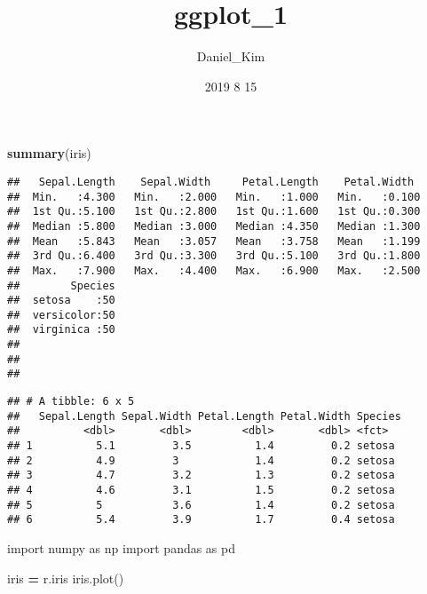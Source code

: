 \documentclass[]{article}
\title{ggplot\_1}
\author{Daniel\_Kim}
\date{2019 8 15}
\newenvironment{Shaded}{\begin{snugshade}}{\end{snugshade}}
\newcommand{\ImportTok}[1]{#1}
\newcommand{\KeywordTok}[1]{\textcolor[rgb]{0.13,0.29,0.53}{\textbf{#1}}}
\newcommand{\NormalTok}[1]{#1}
\newcommand{\OperatorTok}[1]{\textcolor[rgb]{0.81,0.36,0.00}{\textbf{#1}}}
\newcommand{\StringTok}[1]{\textcolor[rgb]{0.31,0.60,0.02}{#1}}
\begin{document}
\maketitle

\begin{Shaded}
\begin{Highlighting}[]
\KeywordTok{summary}\NormalTok{(iris)}
\end{Highlighting}
\end{Shaded}

\begin{verbatim}
##   Sepal.Length    Sepal.Width     Petal.Length    Petal.Width   
##  Min.   :4.300   Min.   :2.000   Min.   :1.000   Min.   :0.100  
##  1st Qu.:5.100   1st Qu.:2.800   1st Qu.:1.600   1st Qu.:0.300  
##  Median :5.800   Median :3.000   Median :4.350   Median :1.300  
##  Mean   :5.843   Mean   :3.057   Mean   :3.758   Mean   :1.199  
##  3rd Qu.:6.400   3rd Qu.:3.300   3rd Qu.:5.100   3rd Qu.:1.800  
##  Max.   :7.900   Max.   :4.400   Max.   :6.900   Max.   :2.500  
##        Species  
##  setosa    :50  
##  versicolor:50  
##  virginica :50  
##                 
##                 
## 
\end{verbatim}

\begin{Shaded}
\end{Shaded}

\begin{verbatim}
## # A tibble: 6 x 5
##   Sepal.Length Sepal.Width Petal.Length Petal.Width Species
##          <dbl>       <dbl>        <dbl>       <dbl> <fct>  
## 1          5.1         3.5          1.4         0.2 setosa 
## 2          4.9         3            1.4         0.2 setosa 
## 3          4.7         3.2          1.3         0.2 setosa 
## 4          4.6         3.1          1.5         0.2 setosa 
## 5          5           3.6          1.4         0.2 setosa 
## 6          5.4         3.9          1.7         0.4 setosa
\end{verbatim}

\begin{Shaded}
\begin{Highlighting}[]
\ImportTok{import}\NormalTok{ numpy }\ImportTok{as}\NormalTok{ np}
\ImportTok{import}\NormalTok{ pandas }\ImportTok{as}\NormalTok{ pd}

\NormalTok{iris }\OperatorTok{=}\NormalTok{ r.iris}
\NormalTok{iris.plot()}
\end{Highlighting}
\end{Shaded}
\end{document}
